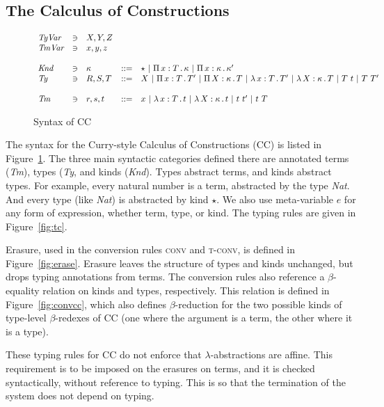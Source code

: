 \documentclass{article}
\begin{document}
\subsection{The Calculus of Constructions}

\begin{figure}
\[
\begin{array}{lllll}
  \textit{TyVar} & \ni & X,Y,Z & \ &\ \\
  \textit{TmVar} & \ni & x,y,z & \ &\ \\\\
  \textit{Knd} & \ni & \kappa & ::= & \star\ |\ \Pia{x}{T}{\kappa}\ |\ \Pia{x}{\kappa}{\kappa'} \\
  \textit{Ty} & \ni & R,S,T & ::= &
     X \ | \ \Pia{x}{T}{T'}\ |\ \Pia{X}{\kappa}{T}\ |\ \tlam{x}{T}{T'} \ |\ \tlam{X}{\kappa}{T}\ |\ T\ t\ |\ T\ T' \\\\
  \textit{Tm} & \ni & r,s,t & ::= & x \ |\ \tlam{x}{T}{t}\ | \ \tlam{X}{\kappa}{t}\ |\ t\ t'\ |\ t\ T \ 
\end{array}
\]
\caption{Syntax of CC}
\label{fig:ccsyn}
\end{figure}

The syntax for the Curry-style Calculus of Constructions (CC) is
listed in Figure~\ref{fig:ccsyn}.  The three main syntactic categories
defined there are annotated terms (\textit{Tm}), types (\textit{Ty},
and kinds (\textit{Knd}).  Types abstract terms, and kinds abstract
types.  For example, every natural number is a term, abstracted by the
type \textit{Nat}.  And every type (like \textit{Nat}) is abstracted
by kind $\star$.  We also use meta-variable $e$ for any form of expression,
whether term, type, or kind.  The typing rules are given in Figure~\ref{fig:tc}.

Erasure, used in the conversion rules \textsc{conv} and
\textsc{t-conv}, is defined in Figure~\ref{fig:erase}.  Erasure leaves
the structure of types and kinds unchanged, but drops typing
annotations from terms.  The conversion rules also reference a
$\beta$-equality relation on kinds and types, respectively.  This
relation is defined in Figure~\ref{fig:convcc}, which also defines
$\beta$-reduction for the two possible kinds of type-level
$\beta$-redexes of CC (one where the argument is a term, the other
where it is a type).

These typing rules for CC do not enforce that $\lambda$-abstractions
are affine.  This requirement is to be imposed on the erasures on
terms, and it is checked syntactically, without reference to typing.
This is so that the termination of the system does not depend on
typing.
\end{document}
